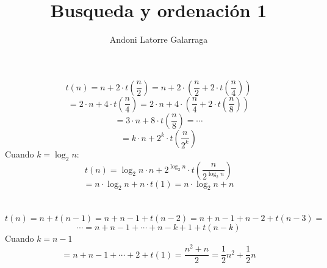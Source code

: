 \documentclass{article}
\title{Busqueda y ordenación 1}
\author{Andoni Latorre Galarraga}
\date{}
\begin{document}
\maketitle

\section{}
$$
t(n) = n + 2 \cdot t(\frac{n}{2}) = n + 2 \cdot ( \frac{n}{2} + 2 \cdot t(\frac{n}{4}) )
$$
$$
= 2 \cdot n + 4 \cdot t(\frac{n}{4}) = 2 \cdot n + 4 \cdot ( \frac{n}{4} + 2 \cdot t(\frac{n}{8}))
$$
$$
= 3 \cdot n + 8 \cdot t(\frac{n}{8}) = \cdots
$$
$$
= k \cdot n + 2^k \cdot t(\frac{n}{2^k})
$$
Cuando $k = \log_2 n$:
$$
t(n) = \log_2 n \cdot n + 2^{\log_2 n} \cdot t(\frac{n}{2^{\log_2 n}})
$$
$$
= n \cdot \log_2 n + n \cdot t(1) = n \cdot \log_2 n + n
$$
\section{}
$$
t(n) = n + t(n-1) = n + n-1 + t(n-2) = n + n-1 + n-2 + t(n-3) =
$$
$$
\cdots = n + n-1 + \cdots + n-k+1 + t(n-k)
$$
Cuando $k = n-1$
$$
= n + n-1 + \cdots + 2 + t(1) = \frac{n^2+n}{2} = \frac{1}{2} n^2 + \frac{1}{2} n
$$
\end{document}
